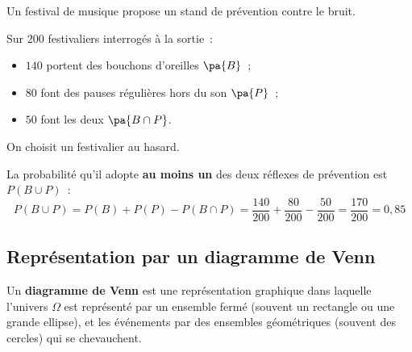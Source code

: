 \begin{ex}
	Un festival de musique propose un stand de prévention contre le bruit.

	Sur $200$ festivaliers interrogés à la sortie~:

	\begin{itemize}
		\item $140$ portent des bouchons d'oreilles $\pa{B}$~;
		\item $80$ font des pauses régulières hors du son $\pa{P}$~;
		\item $50$ font les deux $\pa{B \cap P}$.
	\end{itemize}

	On choisit un festivalier au hasard.

	La probabilité qu'il adopte \textbf{au moins un} des deux réflexes de prévention est $P(B \cup P)$~:
	\[ P(B \cup P) = P(B) + P(P) - P(B \cap P) = \dfrac{140}{200} + \dfrac{80}{200} - \dfrac{50}{200} = \dfrac{170}{200} = 0{,}85 \]
\end{ex}

\subsection{Représentation par un diagramme de Venn}

\begin{defin}
	Un \textbf{diagramme de Venn} est une représentation graphique dans laquelle l'univers $\Omega$ est représenté par un ensemble fermé (souvent un rectangle ou une grande ellipse), et les événements par des ensembles géométriques (souvent des cercles) qui se chevauchent.
\end{defin}

